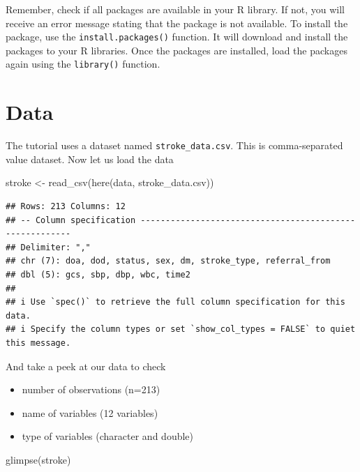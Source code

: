 \documentclass[
  10pt,
]{krantz}
\newenvironment{Shaded}{\begin{snugshade}}{\end{snugshade}}
\newcommand{\FunctionTok}[1]{\textcolor[rgb]{0.00,0.00,0.00}{#1}}
\newcommand{\NormalTok}[1]{#1}
\newcommand{\OtherTok}[1]{\textcolor[rgb]{0.56,0.35,0.01}{#1}}
\newcommand{\StringTok}[1]{\textcolor[rgb]{0.31,0.60,0.02}{#1}}
\providecommand{\tightlist}{%
  \setlength{\itemsep}{0pt}\setlength{\parskip}{0pt}}
\begin{document}
Remember, check if all packages are available in your R library. If not, you will receive an error message stating that the package is not available. To install the package, use the \texttt{install.packages()} function. It will download and install the packages to your R libraries. Once the packages are installed, load the packages again using the \texttt{library()} function.

\hypertarget{data}{%
\section{Data}\label{data}}

The tutorial uses a dataset named \texttt{stroke\_data.csv}. This is comma-separated value dataset. Now let us load the data

\begin{Shaded}
\begin{Highlighting}[]
\NormalTok{stroke }\OtherTok{\textless{}{-}} \FunctionTok{read\_csv}\NormalTok{(}\FunctionTok{here}\NormalTok{(}\StringTok{\textquotesingle{}data\textquotesingle{}}\NormalTok{, }\StringTok{\textquotesingle{}stroke\_data.csv\textquotesingle{}}\NormalTok{))}
\end{Highlighting}
\end{Shaded}

\begin{verbatim}
## Rows: 213 Columns: 12
## -- Column specification --------------------------------------------------------
## Delimiter: ","
## chr (7): doa, dod, status, sex, dm, stroke_type, referral_from
## dbl (5): gcs, sbp, dbp, wbc, time2
## 
## i Use `spec()` to retrieve the full column specification for this data.
## i Specify the column types or set `show_col_types = FALSE` to quiet this message.
\end{verbatim}

And take a peek at our data to check

\begin{itemize}
\tightlist
\item
  number of observations (n=213)
\item
  name of variables (12 variables)
\item
  type of variables (character and double)
\end{itemize}

\begin{Shaded}
\begin{Highlighting}[]
\FunctionTok{glimpse}\NormalTok{(stroke)}
\end{Highlighting}
\end{Shaded}
\end{document}

